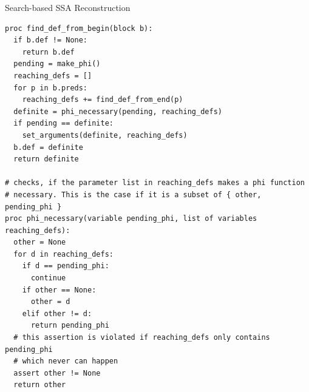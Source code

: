 \begin{algorithm}
	\caption{Search-based SSA Reconstruction}
	\label{alg:ssaconstr_click}

\begin{verbatim}
proc find_def_from_begin(block b):
  if b.def != None:
    return b.def
  pending = make_phi()
  reaching_defs = []
  for p in b.preds:
    reaching_defs += find_def_from_end(p)
  definite = phi_necessary(pending, reaching_defs)
  if pending == definite:
    set_arguments(definite, reaching_defs)
  b.def = definite
  return definite

# checks, if the parameter list in reaching_defs makes a phi function 
# necessary. This is the case if it is a subset of { other, pending_phi }
proc phi_necessary(variable pending_phi, list of variables reaching_defs):
  other = None
  for d in reaching_defs:
    if d == pending_phi:
      continue
    if other == None:
      other = d
    elif other != d:
      return pending_phi
  # this assertion is violated if reaching_defs only contains pending_phi
  # which never can happen
  assert other != None
  return other
  
\end{verbatim}
\end{algorithm}

